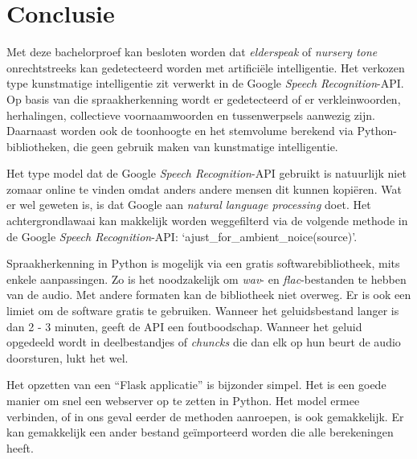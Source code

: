 
\chapter{Conclusie}
\label{ch:conclusie}


Met deze bachelorproef kan besloten worden dat \textit{elderspeak} of \textit{nursery tone} onrechtstreeks kan gedetecteerd worden met artificiële intelligentie. Het verkozen type kunstmatige intelligentie zit verwerkt in de Google \textit{Speech Recognition}-API. Op basis van die spraakherkenning wordt er gedetecteerd of er verkleinwoorden, herhalingen, collectieve voornaamwoorden en tussenwerpsels aanwezig zijn. Daarnaast worden ook de toonhoogte en het stemvolume berekend via Python-bibliotheken, die geen gebruik maken van kunstmatige intelligentie.

Het type model dat de Google \textit{Speech Recognition}-API gebruikt is natuurlijk niet zomaar online te vinden omdat anders andere mensen dit kunnen kopiëren. Wat er wel geweten is, is dat Google aan \textit{natural language processing} doet.
Het achtergrondlawaai kan makkelijk worden weggefilterd via de volgende methode in de Google \textit{Speech Recognition}-API: `ajust\_for\_ambient\_noice(source)'.

Spraakherkenning in Python is mogelijk via een gratis softwarebibliotheek, mits enkele aanpassingen. Zo is het noodzakelijk om \textit{wav}- en \textit{flac}-bestanden te hebben van de audio. Met andere formaten kan de bibliotheek niet overweg. Er is ook een limiet om de software gratis te gebruiken. Wanneer het geluidsbestand langer is dan 2 - 3 minuten, geeft de API een foutboodschap. Wanneer het geluid opgedeeld wordt in deelbestandjes of \textit{chuncks} die dan elk op hun beurt de audio doorsturen, lukt het wel.

Het opzetten van een ``Flask applicatie'' is bijzonder simpel. Het is een goede manier om snel een webserver op te zetten in Python. Het model ermee verbinden, of in ons geval eerder de methoden aanroepen, is ook gemakkelijk. Er kan gemakkelijk een ander bestand geïmporteerd worden die alle berekeningen heeft.

